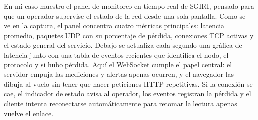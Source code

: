 En mi caso muestro el panel de monitoreo en tiempo real de SGIRI, pensado para que un operador supervise el estado de la red desde una sola pantalla.
Como se ve en la captura, el panel concentra cuatro métricas principales: latencia promedio, paquetes UDP con su porcentaje de pérdida, conexiones TCP activas y el estado general del servicio.
Debajo se actualiza cada segundo una gráfica de latencia junto con una tabla de eventos recientes que identifica el nodo, el protocolo y si hubo pérdida.
Aquí el WebSocket cumple el papel central: el servidor empuja las mediciones y alertas apenas ocurren, y el navegador las dibuja al vuelo sin tener que hacer peticiones HTTP repetitivas.
Si la conexión se cae, el indicador de estado avisa al operador, los eventos registran la pérdida y el cliente intenta reconectarse automáticamente para retomar la lectura apenas vuelve el enlace.
